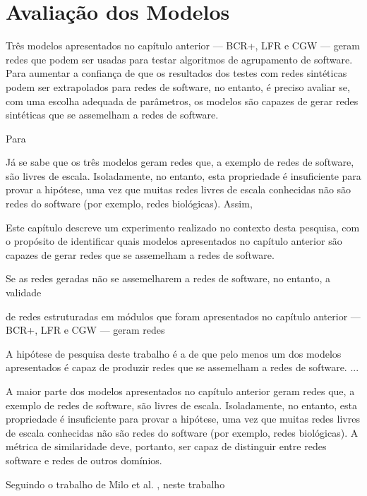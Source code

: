 %	

\chapter{Avaliação dos Modelos}

Três modelos apresentados no capítulo anterior --- BCR+, LFR e CGW --- geram redes que podem ser usadas para testar algoritmos de agrupamento de software. Para aumentar a confiança de que os resultados dos testes com redes sintéticas podem ser extrapolados para redes de software, no entanto, é preciso avaliar se, com uma escolha adequada de parâmetros, os modelos são capazes de gerar redes sintéticas que se assemelham a redes de software. 

Para 

Já se sabe que os três modelos geram redes que, a exemplo de redes de software, são livres de escala. Isoladamente, no entanto, esta propriedade é insuficiente para provar a hipótese, uma vez que muitas redes livres de escala conhecidas não são redes do software (por exemplo, redes biológicas). Assim, 



Este capítulo descreve um experimento realizado no contexto desta pesquisa, com o propósito de identificar quais modelos apresentados no capítulo anterior são capazes de gerar redes que se assemelham a redes de software.

Se as redes geradas não se assemelharem a redes de software, no entanto, a validade 


de redes estruturadas em módulos que foram apresentados no capítulo anterior --- BCR+, LFR e CGW --- geram redes

A hipótese de pesquisa deste trabalho é a de que pelo menos um dos modelos apresentados é capaz de produzir redes que se assemelham a redes de software.
...

A maior parte dos modelos apresentados no capítulo anterior geram redes que, a exemplo de redes de software, são livres de escala. Isoladamente, no entanto, esta propriedade é insuficiente para provar a hipótese, uma vez que muitas redes livres de escala conhecidas não são redes do software (por exemplo, redes biológicas). A métrica de similaridade deve, portanto, ser capaz de distinguir entre redes software e redes de outros domínios.

Seguindo o trabalho de Milo et al. \cite{Milo2004}, neste trabalho 


 
% 
% 
% 
% 
% 
% 
% 
% 
% 
